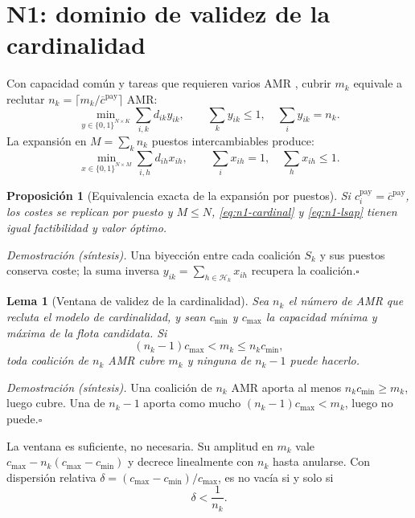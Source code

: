 \documentclass[12pt,a4paper]{article}
\newtheorem{n1prop}{Proposición}
\newtheorem{n1lema}{Lema}
\theoremstyle{remark}
\theoremstyle{plain}
\newcommand{\proofsketch}[1]{%
  {\small\textit{Demostración (síntesis).} #1\hfill$\square$\par}
}
\begin{document}
\section{N1: dominio de validez de la cardinalidad}

\setlength{\abovedisplayskip}{2.5pt}\setlength{\belowdisplayskip}{2.5pt}

Con capacidad común y tareas que requieren varios AMR
\citep{korsahStentzDias2013iTax}, cubrir $m_k$ equivale a reclutar
$n_k=\lceil m_k/\overline{c}^{\mathrm{pay}}\rceil$ AMR:
\begin{equation}
\label{eq:n1-cardinal}
\min_{y\in\{0,1\}^{N\times K}}\sum_{i,k}d_{ik}y_{ik},
\qquad \sum_ky_{ik}\le1,\quad \sum_iy_{ik}=n_k .
\tag{3}
\end{equation}
La expansión en $M=\sum_kn_k$ puestos intercambiables produce:
\begin{equation}
\label{eq:n1-lsap}
\min_{x\in\{0,1\}^{N\times M}}\sum_{i,h}d_{ih}x_{ih},
\qquad \sum_ix_{ih}=1,\quad \sum_hx_{ih}\le1 .
\tag{4}
\end{equation}

\begin{n1prop}[Equivalencia exacta de la expansión por puestos]
Si $c_i^{\mathrm{pay}}=\overline{c}^{\mathrm{pay}}$, los costes se replican por puesto y
$M\le N$, \eqref{eq:n1-cardinal} y \eqref{eq:n1-lsap} tienen igual factibilidad y
valor óptimo.
\end{n1prop}
\proofsketch{Una biyección entre cada coalición $S_k$ y sus puestos conserva coste;
la suma inversa $y_{ik}=\sum_{h\in\mathcal H_k}x_{ih}$ recupera la coalición.}

\begin{n1lema}[Ventana de validez de la cardinalidad]
Sea $n_k$ el número de AMR que recluta el modelo de cardinalidad, y sean
$c_{\min}$ y $c_{\max}$ la capacidad mínima y máxima de la flota candidata. Si
\begin{equation}
(n_k-1)c_{\max}<m_k\le n_kc_{\min},
\tag{5}
\end{equation}
toda coalición de $n_k$ AMR cubre $m_k$ y ninguna de $n_k-1$ puede hacerlo.
\end{n1lema}
\proofsketch{Una coalición de $n_k$ AMR aporta al menos $n_kc_{\min}\ge m_k$, luego
cubre. Una de $n_k-1$ aporta como mucho $(n_k-1)c_{\max}<m_k$, luego no puede.}
La ventana es suficiente, no necesaria. Su amplitud en $m_k$ vale
$c_{\max}-n_k(c_{\max}-c_{\min})$ y decrece linealmente con $n_k$ hasta anularse.
Con dispersión relativa $\delta=(c_{\max}-c_{\min})/c_{\max}$, es no vacía si y
solo si
\begin{equation}
\label{eq:n1-spread}
\delta<\frac{1}{n_k}.
\tag{5b}
\end{equation}
\end{document}
